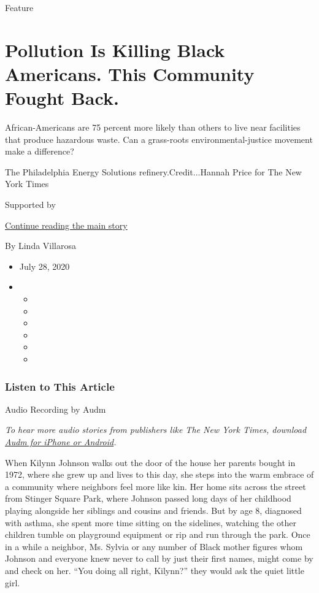 Feature

\hypertarget{pollution-is-killing-black-americans-this-community-fought-back}{%
\section{Pollution Is Killing Black Americans. This Community Fought
Back.}\label{pollution-is-killing-black-americans-this-community-fought-back}}

African-Americans are 75 percent more likely than others to live near
facilities that produce hazardous waste. Can a grass-roots
environmental-justice movement make a difference?

The Philadelphia Energy Solutions refinery.Credit...Hannah Price for The
New York Times

Supported by

\protect\hyperlink{after-sponsor}{Continue reading the main story}

By Linda Villarosa

\begin{itemize}
\item
  July 28, 2020
\item
  \begin{itemize}
  \item
  \item
  \item
  \item
  \item
  \item
  \end{itemize}
\end{itemize}

\hypertarget{listen-to-this-article}{%
\subsubsection{Listen to This Article}\label{listen-to-this-article}}

Audio Recording by Audm

\emph{To hear more audio stories from publishers like The New York
Times, download}
\emph{\href{https://www.audm.com/?utm_source=nytmag\&utm_medium=embed\&utm_campaign=refinery_next_door\%09\%09\%09\%09\%09\%09https://www.audm.com/?utm_source=nytmag\&utm_medium=embed\&utm_campaign=refinery_next_door}{Audm
for iPhone or Android}.}

When Kilynn Johnson walks out the door of the house her parents bought
in 1972, where she grew up and lives to this day, she steps into the
warm embrace of a community where neighbors feel more like kin. Her home
sits across the street from Stinger Square Park, where Johnson passed
long days of her childhood playing alongside her siblings and cousins
and friends. But by age 8, diagnosed with asthma, she spent more time
sitting on the sidelines, watching the other children tumble on
playground equipment or rip and run through the park. Once in a while a
neighbor, Ms. Sylvia or any number of Black mother figures whom Johnson
and everyone knew never to call by just their first names, might come by
and check on her. ``You doing all right, Kilynn?'' they would ask the
quiet little girl.

